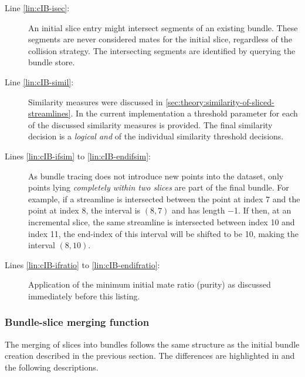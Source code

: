 \begin{description}
%
	\item[Line \ref{lin:cIB-isec}:] An initial slice entry might intersect segments of an existing bundle. These segments are never considered mates for the initial slice, regardless of the collision strategy. The intersecting segments are identified by querying the bundle store.
%
	\item[Line \ref{lin:cIB-simil}:] Similarity measures were discussed in \autoref{sec:theory:similarity-of-sliced-streamlines}. %
In the current implementation a threshold parameter for each of the discussed similarity measures is provided. The final similarity decision is a \emph{logical and} of the individual similarity threshold decisions.
%
	\item[Lines \ref{lin:cIB-ifsim} to \ref{lin:cIB-endifsim}:] As bundle tracing does not introduce new points into the dataset, only points lying \emph{completely within two slices} are part of the final bundle. %
For example, if a streamline is intersected between the point at index \num{7} and the point at index \num{8}, the interval is $(8,7)$ and has length \num{-1}.
  If then, at an incremental slice, the same streamline is intersected between index \num{10} and index \num{11}, the end-index of this interval will be shifted to be \num{10}, making the interval $(8,10)$.
%
	\item[Lines \ref{lin:cIB-ifratio} to \ref{lin:cIB-endifratio}:] Application of the minimum initial mate ratio (purity) as discussed immediately before this listing.
%
\end{description}


\subsubsection{Bundle-slice merging function}
\label{sec:impl:bundle-slice-merging}

The merging of slices into bundles follows the same structure as the initial bundle creation described in the previous section. The differences are highlighted in  and the following descriptions.

